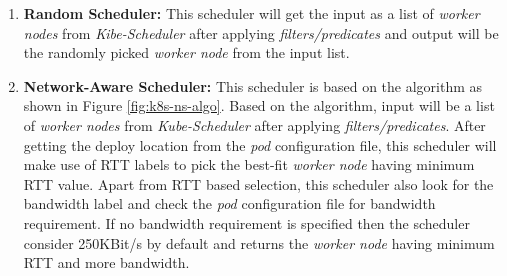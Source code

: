 \begin{enumerate}
  \item \textbf{Random Scheduler:} This scheduler will get the input as a list of \emph{worker nodes} from \emph{Kibe-Scheduler} after applying \emph{filters/predicates} and output will be the randomly picked \emph{worker node} from the input list\cite{Santos2019}.
  \item \textbf{Network-Aware Scheduler:} This scheduler is based on the algorithm as shown in Figure \ref{fig:k8s-ns-algo}. Based on the algorithm, input will be a list of \emph{worker nodes} from \emph{Kube-Scheduler} after applying \emph{filters/predicates}. After getting the deploy location from the \emph{pod} configuration file, this scheduler will make use of RTT labels to pick the best-fit \emph{worker node} having minimum RTT value\cite{Santos2019}. Apart from RTT based selection, this scheduler also look for the bandwidth label and check the \emph{pod} configuration file for bandwidth requirement\cite{Santos2019}. If no bandwidth requirement is specified then the scheduler consider 250KBit/s by default and returns the \emph{worker node} having minimum RTT and more bandwidth\cite{Santos2019}.
\end{enumerate}
\vspace{-0.6cm}
